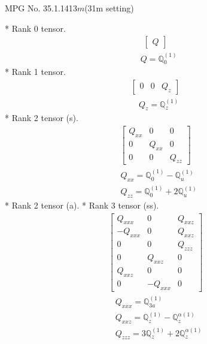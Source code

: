 \documentclass[fleqn,8pt,landscape]{jsarticle}
\begin{document}
\setcounter{MaxMatrixCols}{32}

\renewcommand{\tablename}{Table~}
\renewcommand{\figurename}{Figure~}
\begin{center}
\LARGE
MPG No. 35.1.141\quad$3m$\quad(31m setting)
\end{center}
* Rank 0 tensor.
\begin{align*}
\begin{bmatrix} Q \end{bmatrix}
\end{align*}
\begin{align*}
& Q = \mathbb{Q}_{0}^{(1)}
\end{align*}
* Rank 1 tensor.
\begin{align*}
\begin{bmatrix} 0 & 0 & Q_{z} \end{bmatrix}
\end{align*}
\begin{align*}
& Q_{z} = \mathbb{Q}_{z}^{(1)}
\end{align*}
* Rank 2 tensor (s).
\begin{align*}
\begin{bmatrix} Q_{xx} & 0 & 0 \\ 0 & Q_{xx} & 0 \\ 0 & 0 & Q_{zz} \end{bmatrix}
\end{align*}
\begin{align*}
& Q_{xx} = \mathbb{Q}_{0}^{(1)} - \mathbb{Q}_{u}^{(1)} \\
& Q_{zz} = \mathbb{Q}_{0}^{(1)} + 2 \mathbb{Q}_{u}^{(1)}
\end{align*}
* Rank 2 tensor (a).
* Rank 3 tensor (ss).
\begin{align*}
\begin{bmatrix} Q_{xxx} & 0 & Q_{xxz} \\ - Q_{xxx} & 0 & Q_{xxz} \\ 0 & 0 & Q_{zzz} \\ 0 & Q_{xxz} & 0 \\ Q_{xxz} & 0 & 0 \\ 0 & - Q_{xxx} & 0 \end{bmatrix}
\end{align*}
\begin{align*}
& Q_{xxx} = \mathbb{Q}_{3a}^{(1)} \\
& Q_{xxz} = \mathbb{Q}_{z}^{(1)} - \mathbb{Q}_{z}^{\alpha(1)} \\
& Q_{zzz} = 3 \mathbb{Q}_{z}^{(1)} + 2 \mathbb{Q}_{z}^{\alpha(1)}
\end{align*}
\end{document}
